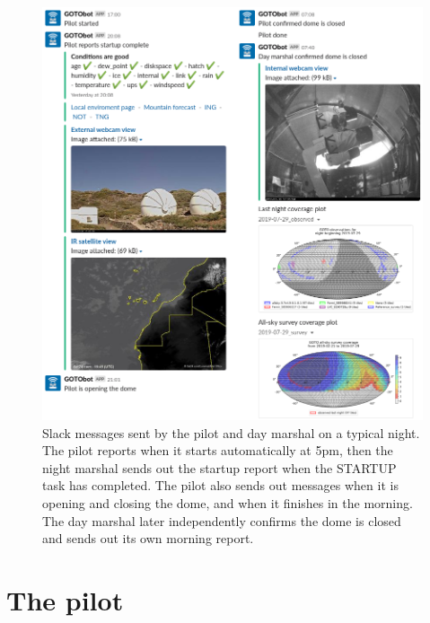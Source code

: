 \begin{colsection}
\begin{figure}[p]
    \begin{center}
        \includegraphics[width=\linewidth]{images/slack2.png}
    \end{center}
    \caption[Slack messages sent by the pilot and day marshal]{
        Slack messages sent by the pilot and day marshal on a typical night. The pilot reports when it starts automatically at 5pm, then the night marshal sends out the startup report when the STARTUP task has completed. The pilot also sends out messages when it is opening and closing the dome, and when it finishes in the morning. The day marshal later independently confirms the dome is closed and sends out its own morning report.
    }\label{fig:pilot_slack}
\end{figure}

\end{colsection}


\section{The pilot}
\label{sec:pilot}


